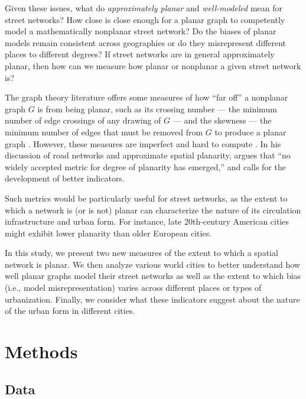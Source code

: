 \documentclass[Afour,sageh,times]{sagej}
\begin{document}
Given these issues, what do \emph{approximately planar} and \emph{well-modeled} mean for street networks? How close is close enough for a planar graph to competently model a mathematically nonplanar street network? Do the biases of planar models remain consistent across geographies or do they misrepresent different places to different degrees? If street networks are in general approximately planar, then how can we measure how planar or nonplanar a given street network is?

The graph theory literature offers some measures of how \enquote{far off} a nonplanar graph $G$ is from being planar, such as its crossing number --- the minimum number of edge crossings of any drawing of $G$ --- and the skewness --- the minimum number of edges that must be removed from $G$ to produce a planar graph \citep{liebers_planarizing_2001,szekely_successful_2004,chimani_non-planar_2009}. However, these measures are imperfect and hard to compute \citep{chimani_vertex_2012,szekely_successful_2004}. In his discussion of road networks and approximate spatial planarity, \citet[p.~133]{newman_networks:_2010} argues that \enquote{no widely accepted metric for degree of planarity has emerged,} and calls for the development of better indicators.

Such metrics would be particularly useful for street networks, as the extent to which a network is (or is not) planar can characterize the nature of its circulation infrastructure and urban form. For instance, late 20th-century American cities might exhibit lower planarity than older European cities.

In this study, we present two new measures of the extent to which a spatial network is planar. We then analyze various world cities to better understand how well planar graphs model their street networks as well as the extent to which bias (i.e., model misrepresentation) varies across different places or types of urbanization. Finally, we consider what these indicators suggest about the nature of the urban form in different cities.



\section{Methods}

\subsection{Data}
\end{document}

